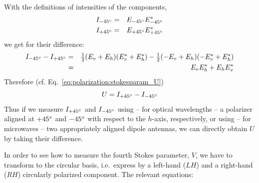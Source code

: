 %
With the definitions of intensities of the components,
\begin{eqnarray}
  \label{eq:polarization:Im45}
  I_{-45^\circ} &=& E_{-45^\circ} E_{-45^\circ}^\ast\\
  \label{eq:polarization:Ip45}
  I_{+45^\circ} &=& E_{+45^\circ} E_{+45^\circ}^\ast
\end{eqnarray}
we get for their difference:
\begin{eqnarray}
   I_{-45^\circ} -  I_{+45^\circ}
   &=&
     \textstyle\frac{1}{2} (E_v + E_h) (E_v^\ast + E_h^\ast)
    - \textstyle\frac{1}{2} (-E_v + E_h) (-E_v^\ast + E_h^\ast)\\ \nonumber
   &=&
   E_v E_h^\ast + E_h E_v^\ast
  \label{eq:polarization:Idiff_lin45base}
\end{eqnarray}
Therefore (cf. Eq.~\ref{eq:polarization:stokesparam_U})
\begin{equation}
  \label{eq:polarization:U_Idiff}
  U =   I_{+45^\circ} -  I_{-45^\circ}
\end{equation}
Thus if we measure $I_{+45^\circ}$ and $I_{-45^\circ}$ using -- for
optical wavelengths -- a polarizer aligned at $+45^\circ$ and
$-45^\circ$ with respect to the $h$-axis, respectively, or using --
for microwaves -- two appropriately aligned dipole antennas, we can
directly obtain $U$ by taking their difference.

In order to see how to measure the fourth Stokes parameter, $V$, we
have to transform to the circular basis, i.e.\ express  by a
left-hand ($LH$) and a right-hand ($RH$) circularly polarized component. The
relevant equations:

